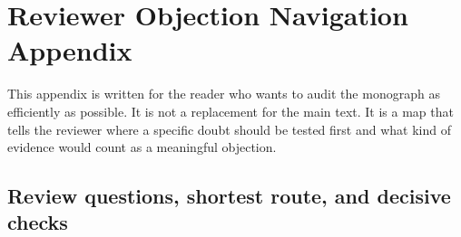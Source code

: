 \section{Reviewer Objection Navigation Appendix}
\label{sec:oc13-reviewer-navigation}

This appendix is written for the reader who wants to audit the monograph as efficiently as
possible. It is not a replacement for the main text. It is a map that tells the reviewer where a
specific doubt should be tested first and what kind of evidence would count as a meaningful
objection.

\subsection{Review questions, shortest route, and decisive checks}

